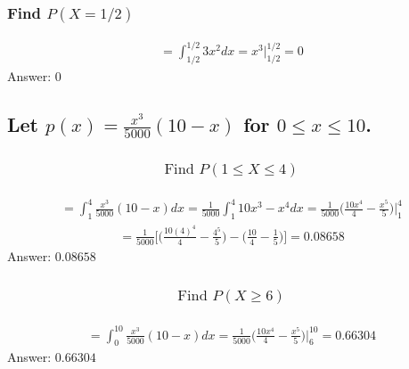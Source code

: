 \documentclass{article}
\begin{document}
\subsubsection{Find $P(X = 1/2)$}
\begin{align*}
	= \int_{1/2}^{1/2}{3x^2 dx} = x^3 \bigg|_{1/2}^{1/2} = 0
\end{align*}
Answer: $0$

\subsection{Let $p(x)=\frac{x^3}{5000}(10 - x)$ for $0 \leq x \leq 10$.}
\subsubsection{
	\begin{align*}
		\text{Find } P(1 \leq X \leq 4)
	\end{align*}
}
\begin{align*}
	= \int_1^4{\frac{x^3}{5000} (10 - x)dx} = \frac{1}{5000} \int_1^4{10x^3 - x^4 dx} = \frac{1}{5000} \bigg( \frac{10x^4}{4} - \frac{x^5}{5} \bigg) \bigg|_1^4
\end{align*}
\begin{align*}
	= \frac{1}{5000} \bigg[ \bigg( \frac{10(4)^4}{4} - \frac{4^5}{5} \bigg) - \bigg( \frac{10}{4} - \frac{1}{5} \bigg) \bigg] = 0.08658
\end{align*}
Answer: $0.08658$

\subsubsection{
	\begin{align*}
		\text{Find } P(X \geq 6)
	\end{align*}
}
\begin{align*}
	= \int_0^{10}{\frac{x^3}{5000} (10 - x)dx} = \frac{1}{5000} \bigg( \frac{10x^4}{4} - \frac{x^5}{5} \bigg) \bigg|_6^{10} = 0.66304
\end{align*}
Answer: $0.66304$

\end{document}
